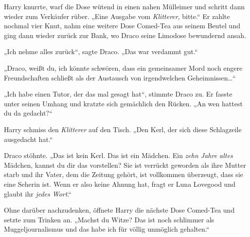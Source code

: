 Harry knurrte, warf die Dose wütend in einen nahen Mülleimer und schritt dann wieder zum Verkäufer rüber. „Eine Ausgabe vom \emph{Klitterer}, bitte.“ Er zahlte nochmal vier Knut, nahm eine weitere Dose Comed-Tea aus seinem Beutel und ging dann wieder zurück zur Bank, wo Draco seine Limodose bewundernd ansah.

„Ich nehme alles zurück“, sagte Draco. „Das war verdammt gut.“

„Draco, weißt du, ich könnte schwören, dass ein gemeinsamer Mord noch engere Freundschaften schließt als der Austausch von irgendwelchen Geheimnissen…“

„Ich habe einen Tutor, der das mal gesagt hat“, stimmte Draco zu. Er fasste unter seinen Umhang und kratzte sich gemächlich den Rücken. „An wen hattest du da gedacht?“

Harry schmiss den \emph{Klitterer} auf den Tisch. „Den Kerl, der sich diese Schlagzeile ausgedacht hat.“

Draco stöhnte. „Das ist kein Kerl. Das ist ein Mädchen. Ein \emph{zehn Jahre altes} Mädchen, kannst du dir das vorstellen? Sie ist verrückt geworden als ihre Mutter starb und ihr Vater, dem die Zeitung gehört, ist vollkommen überzeugt, dass sie eine Seherin ist. Wenn er also keine Ahnung hat, fragt er Luna Lovegood und glaubt ihr \emph{jedes Wort}.“

Ohne darüber nachzudenken, öffnete Harry die nächste Dose Comed-Tea und setzte zum Trinken an. „Machst du Witze? Das ist noch schlimmer als Muggeljournalismus und das habe ich für völlig unmöglich gehalten.“

